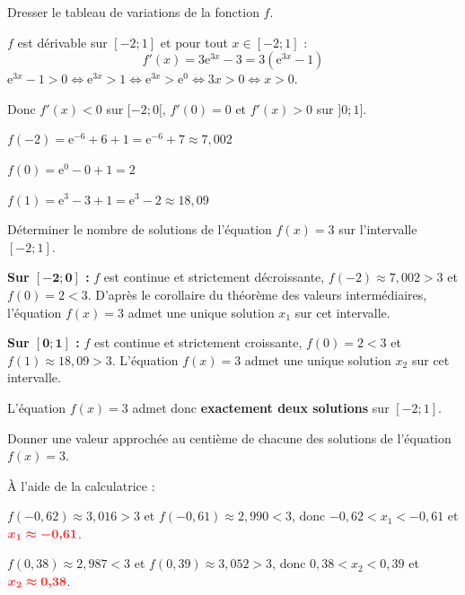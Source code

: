 \documentclass[11pt,a4paper]{article}  %
\begin{document}
	\begin{enumMet}
		\item Dresser le tableau de variations de la fonction $f$.
		
		\begin{corrBox}
			$f$ est dérivable sur $[-2;1]$ et pour tout $x\in[-2;1]$ :
			\[f'(x)=3\mathrm{e}^{3x}-3=3\left(\mathrm{e}^{3x}-1\right)\]
			$\mathrm{e}^{3x}-1>0 \iff \mathrm{e}^{3x}>1 \iff \mathrm{e}^{3x}>\mathrm{e}^0 \iff 3x>0 \iff x>0$.
			
			Donc $f'(x)<0$ sur $[-2;0[$, $f'(0)=0$ et $f'(x)>0$ sur $]0;1]$.
			
			$f(-2)=\mathrm{e}^{-6}+6+1=\mathrm{e}^{-6}+7\approx7{,}002$
			
			$f(0)=\mathrm{e}^0-0+1=2$
			
			$f(1)=\mathrm{e}^3-3+1=\mathrm{e}^3-2\approx18{,}09$
			
			\begin{center}
			\end{center}
		\end{corrBox}
		
		\item Déterminer le nombre de solutions de l'équation $f(x)=3$ sur l'intervalle $[-2 ; 1]$.
		
		\begin{corrBox}
			\textbf{Sur $\bm{[-2;0]}$ :} $f$ est continue et strictement décroissante, $f(-2)\approx7{,}002>3$ et $f(0)=2<3$. D'après le corollaire du théorème des valeurs intermédiaires, l'équation $f(x)=3$ admet une unique solution $x_1$ sur cet intervalle.
			
			\textbf{Sur $\bm{[0;1]}$ :} $f$ est continue et strictement croissante, $f(0)=2<3$ et $f(1)\approx18{,}09>3$. L'équation $f(x)=3$ admet une unique solution $x_2$ sur cet intervalle.
			
			L'équation $f(x)=3$ admet donc \textbf{exactement deux solutions} sur $[-2;1]$.
		\end{corrBox}
		
		\item Donner une valeur approchée au centième de chacune des solutions de l'équation $f(x)=3$.
		
		\begin{corrBox}
			À l'aide de la calculatrice :
			
			$f(-0{,}62)\approx3{,}016>3$ et $f(-0{,}61)\approx2{,}990<3$, donc $-0{,}62<x_1<-0{,}61$ et $\mRouge{x_1\approx-0{,}61}$.
			
			$f(0{,}38)\approx2{,}987<3$ et $f(0{,}39)\approx3{,}052>3$, donc $0{,}38<x_2<0{,}39$ et $\mRouge{x_2\approx0{,}38}$.
		\end{corrBox}
	\end{enumMet}
	
\end{document}
